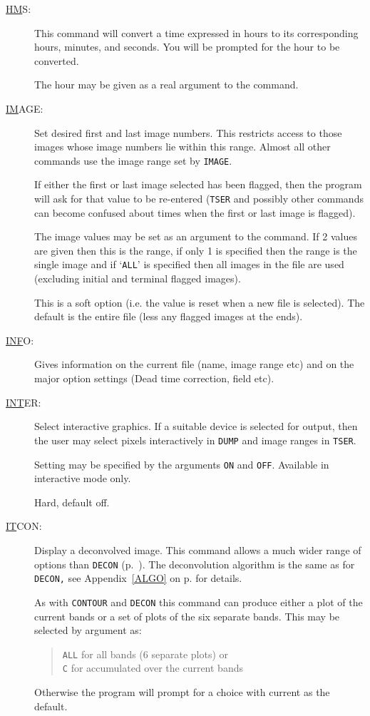 \begin{description}
\item[\underline{HM}S: ] \label{hm}
This command will convert a time expressed in hours to its
corresponding hours, minutes, and seconds. You will be prompted for the
hour to be converted.

The hour may be given as a real argument to the command.

\item[\underline{IM}AGE: ] \label{im}
Set desired first and last image numbers. This restricts access to
those images whose image numbers lie within this range. Almost all
other commands use the image range set by {\tt IMAGE}.

If either the first or last image selected has been flagged, then the
program will ask for that value to be re-entered ({\tt TSER} and
possibly other commands can become confused about times when the first
or last image is flagged).

The image values may be set as an argument to the command. If 2 values
are given then this is the range, if only 1 is specified then the range
is the single image and if `{\tt ALL}' is specified then all images in
the file are used (excluding initial and terminal flagged images).

This is a soft option (i.e. the value is reset when a new file is
selected).  The default is the entire file (less any flagged images at
the ends).

\item[\underline{INF}O: ] \label{inf}
Gives information on the current file (name, image range etc) and on
the major option settings (Dead time correction, field etc).

\item[\underline{INT}ER: ] \label{int}
Select interactive graphics. If a suitable device is selected for
output, then the user may select pixels interactively in {\tt DUMP} and
image ranges in {\tt TSER}.

Setting may be specified by the arguments {\tt ON} and {\tt OFF}.
Available in interactive mode only.

Hard, default off.

\item[\underline{IT}CON: ] \label{it}
Display a deconvolved image.  This command allows a much wider range of
options than {\tt DECON} (p.~\pageref{dec}).  The deconvolution
algorithm is the same as for {\tt DECON,} see Appendix~\ref{ALGO} on
p.\pageref{ALGO} for details.

As with {\tt CONTOUR} and {\tt DECON} this command can produce either a
plot of the current bands or a set of plots of the six separate bands.
This may be selected by argument as:
\begin{quote}
{\tt ALL} for all bands (6 separate plots) or\\ {\tt C} for accumulated
over the current bands
\end{quote}
Otherwise the program will prompt for a choice with current as the
default.


\end{description}
